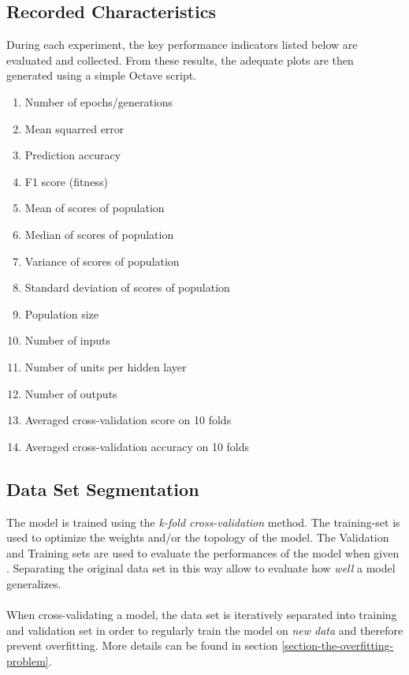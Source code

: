 \documentclass[a4paper,12pt, oneside]{memoir}
\begin{document}
\subsection{Recorded Characteristics}
During each experiment, the key performance indicators listed below are evaluated and collected. From these results, the adequate plots are then generated using a simple Octave script.

\begin{multicols}{2}
  \begin{enumerate}
       \setlength\itemsep{0.0001em}
       \item  Number of epochs/generations
       \item  Mean squarred error
       \item  Prediction accuracy
       \item  F1 score (fitness)
       \item  Mean of scores of population
       \item  Median of scores of population
       \item  Variance of scores of population
       \item  Standard deviation of scores of population
       \item  Population size
       \item  Number of inputs 
       \item  Number of units per hidden layer
       \item  Number of outputs 
       \item  Averaged cross-validation score on 10 folds
       \item  Averaged cross-validation accuracy on 10 folds
  \end{enumerate}
\end{multicols}

\subsection{Data Set Segmentation}
The model is trained using the \textit{k-fold cross-validation} method. The training-set is used to optimize the weights and/or the topology of the model. The Validation and Training sets are used to evaluate the performances of the model when given . Separating the original data set in this way allow to evaluate how \textit{well} a model generalizes.
\\ \\
When cross-validating a model, the data set is iteratively separated into training and validation set in order to regularly train the model on \textit{new data} and therefore prevent overfitting. More details can be found in section \ref{section-the-overfitting-problem}.
\end{document}

